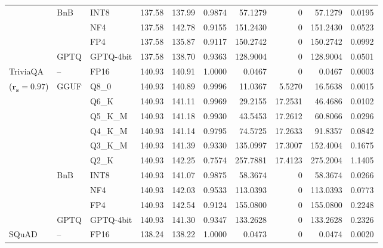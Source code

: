\begin{longtable}{ll l rrrrrrr}
 & BnB & INT8 & 137.58 & 137.99 & 0.9874 & 57.1279 & \cellcolor{cyan!12} $0$ & 57.1279 & 0.0195 \\
 &  & NF4 & 137.58 & 142.78 & \cellcolor{red!18} 0.9155 & \cellcolor{red!18} 151.2430 & \cellcolor{cyan!12} $0$ & \cellcolor{red!18} 151.2430 & \cellcolor{red!18} 0.0523 \\
 &  & FP4 & 137.58 & 135.87 & \cellcolor{red!18} 0.9117 & \cellcolor{red!18} 150.2742 & \cellcolor{cyan!12} $0$ & \cellcolor{red!18} 150.2742 & \cellcolor{red!18} 0.0992 \\
 & GPTQ & GPTQ-4bit & 137.58 & 138.70 & \cellcolor{red!18} 0.9363 & \cellcolor{red!18} 128.9004 & \cellcolor{cyan!12} $0$ & \cellcolor{red!18} 128.9004 & \cellcolor{red!18} 0.0501 \\
\midrule
TriviaQA & -- & FP16 & 140.93 & 140.91 & 1.0000 & 0.0467 & \cellcolor{cyan!12} $0$ & 0.0467 & 0.0003 \\
{\small ($\mathbf{r_s{=}0.97}$)} & GGUF & Q8\_0 & 140.93 & 140.89 & 0.9996 & 11.0367 & 5.5270 & 16.5638 & 0.0015 \\
 &  & Q6\_K & 140.93 & 141.11 & 0.9969 & 29.2155 & 17.2531 & 46.4686 & 0.0102 \\
 &  & Q5\_K\_M & 140.93 & 141.18 & 0.9930 & 43.5453 & 17.2612 & 60.8066 & 0.0296 \\
 &  & Q4\_K\_M & 140.93 & 141.14 & 0.9795 & 74.5725 & 17.2633 & 91.8357 & 0.0842 \\
 &  & Q3\_K\_M & 140.93 & 141.39 & \cellcolor{red!18} 0.9330 & \cellcolor{red!18} 135.0997 & 17.3007 & \cellcolor{red!18} 152.4004 & \cellcolor{red!18} 0.1675 \\
 &  & Q2\_K & 140.93 & 142.25 & \cellcolor{red!35} 0.7574 & \cellcolor{red!35} 257.7881 & 17.4123 & \cellcolor{red!35} 275.2004 & \cellcolor{red!35} 1.1405 \\
 & BnB & INT8 & 140.93 & 141.07 & 0.9875 & 58.3674 & \cellcolor{cyan!12} $0$ & 58.3674 & 0.0266 \\
 &  & NF4 & 140.93 & 142.03 & 0.9533 & 113.0393 & \cellcolor{cyan!12} $0$ & 113.0393 & 0.0773 \\
 &  & FP4 & 140.93 & 142.54 & \cellcolor{red!18} 0.9124 & \cellcolor{red!18} 155.0800 & \cellcolor{cyan!12} $0$ & \cellcolor{red!18} 155.0800 & \cellcolor{red!18} 0.2248 \\
 & GPTQ & GPTQ-4bit & 140.93 & 141.30 & \cellcolor{red!18} 0.9347 & \cellcolor{red!18} 133.2628 & \cellcolor{cyan!12} $0$ & \cellcolor{red!18} 133.2628 & \cellcolor{red!18} 0.2326 \\
\midrule
SQuAD & -- & FP16 & 138.24 & 138.22 & 1.0000 & 0.0473 & \cellcolor{cyan!12} $0$ & 0.0474 & 0.0020 \\

\end{longtable}
